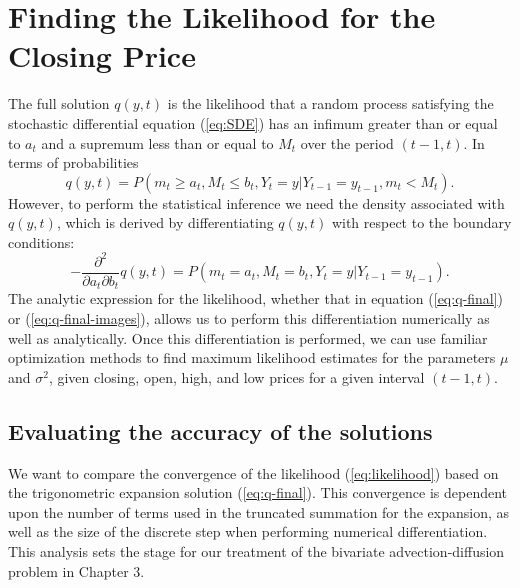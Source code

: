 

\section{Finding the Likelihood for the Closing Price}
The full solution $q(y,t)$ is the likelihood that a random process satisfying the stochastic differential equation (\ref{eq:SDE}) has an infimum greater than or equal to $a_t$ and a supremum less than or equal to $M_t$ over the period $(t-1, t)$.  In terms of probabilities
\[
	q(y,t) = P( m_t \geq a_t, M_t \leq b_t, Y_t = y | Y_{t-1} = y_{t-1}, m_t < M_t ).
\]
%
However, to perform the statistical inference we need the density associated with $q(y,t)$, which is derived by differentiating $q(y,t)$ with respect to the boundary conditions:
\begin{equation} -\frac{\partial^2 }{\partial a_t \partial b_t } q(y,t) = P( m_t = a_t, M_t = b_t, Y_t = y | Y_{t-1} = y_{t-1}). \label{eq:likelihood}
\end{equation}
%
The analytic expression for the likelihood, whether that in equation (\ref{eq:q-final}) or (\ref{eq:q-final-images}), allows us to perform this differentiation numerically as well as analytically. Once this differentiation is performed, we can use familiar optimization methods to find maximum likelihood estimates for the parameters $\mu$ and $\sigma^2$, given closing, open, high, and low prices for a given interval $(t-1,t)$. 

\subsection{Evaluating the accuracy of the solutions}

We want to compare the convergence of the likelihood (\ref{eq:likelihood}) based on the trigonometric expansion solution (\ref{eq:q-final}). This convergence is dependent upon the number of terms used in the truncated summation for the expansion, as well as the size of the discrete step when performing numerical differentiation. This analysis sets the stage for our treatment of the bivariate advection-diffusion problem in Chapter 3.

